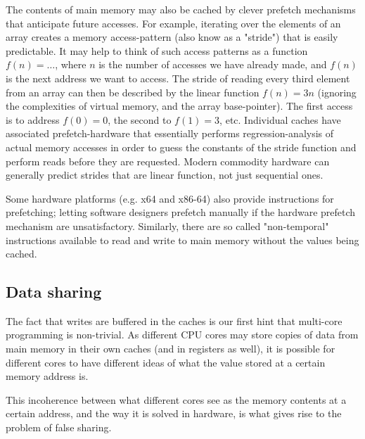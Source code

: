 The contents of main memory may also be cached by clever prefetch mechanisms that
anticipate future accesses. For example, iterating over the elements of an array
creates a memory access-pattern (also know as a "stride") that is easily
predictable. It may help to think of such access patterns as a function $f(n) =
\ldots$, where $n$ is the number of accesses we have already made, and $f(n)$ is
the next address we want to access. The stride of reading every third element
from an array can then be described by the linear function $f(n) = 3n$ (ignoring
the complexities of virtual memory, and the array base-pointer). The first
access is to address $f(0) = 0$, the second to $f(1) = 3$, etc. Individual
caches have associated prefetch-hardware that essentially performs
regression-analysis of actual memory accesses in order to guess the constants of
the stride function and perform reads before they are requested. Modern
commodity hardware can generally predict strides that are linear function, not
just sequential ones.

Some hardware platforms (e.g. x64 and x86-64) also provide instructions for
prefetching; letting software designers prefetch manually if the hardware
prefetch mechanism are unsatisfactory\cite{whatprogrammersshouldknow}.
Similarly, there are so called "non-temporal" instructions available to read and
write to main memory without the values being cached.

\subsection{Data sharing}
The fact that writes are buffered in the caches is our first hint that
multi-core programming is non-trivial. As different CPU cores may store copies
of data from main memory in their own caches (and in registers as well), it is
possible for different cores to have different ideas of what the value stored at
a certain memory address is.


This incoherence between what different cores see as the memory contents at a
certain address, and the way it is solved in hardware, is what gives rise to the
problem of false sharing.


